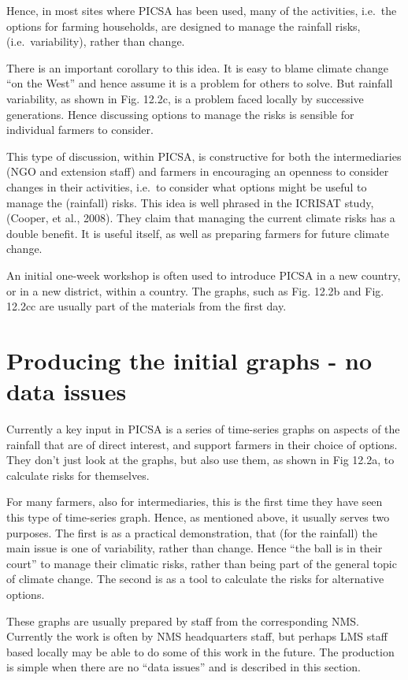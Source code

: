 \documentclass[
  letterpaper,
  DIV=11,
  numbers=noendperiod]{scrreprt}
\begin{document}
Hence, in most sites where PICSA has been used, many of the activities,
i.e.~the options for farming households, are designed to manage the
rainfall risks, (i.e.~variability), rather than change.

There is an important corollary to this idea. It is easy to blame
climate change ``on the West'' and hence assume it is a problem for
others to solve. But rainfall variability, as shown in Fig. 12.2c, is a
problem faced locally by successive generations. Hence discussing
options to manage the risks is sensible for individual farmers to
consider.

This type of discussion, within PICSA, is constructive for both the
intermediaries (NGO and extension staff) and farmers in encouraging an
openness to consider changes in their activities, i.e.~to consider what
options might be useful to manage the (rainfall) risks. This idea is
well phrased in the ICRISAT study, (Cooper, et al., 2008). They claim
that managing the current climate risks has a double benefit. It is
useful itself, as well as preparing farmers for future climate change.

An initial one-week workshop is often used to introduce PICSA in a new
country, or in a new district, within a country. The graphs, such as
Fig. 12.2b and Fig. 12.2cc are usually part of the materials from the
first day.

\section{Producing the initial graphs - no data
issues}\label{producing-the-initial-graphs---no-data-issues}

Currently a key input in PICSA is a series of time-series graphs on
aspects of the rainfall that are of direct interest, and support farmers
in their choice of options. They don't just look at the graphs, but also
use them, as shown in Fig 12.2a, to calculate risks for themselves.

For many farmers, also for intermediaries, this is the first time they
have seen this type of time-series graph. Hence, as mentioned above, it
usually serves two purposes. The first is as a practical demonstration,
that (for the rainfall) the main issue is one of variability, rather
than change. Hence ``the ball is in their court'' to manage their
climatic risks, rather than being part of the general topic of climate
change. The second is as a tool to calculate the risks for alternative
options.

These graphs are usually prepared by staff from the corresponding NMS.
Currently the work is often by NMS headquarters staff, but perhaps LMS
staff based locally may be able to do some of this work in the future.
The production is simple when there are no ``data issues'' and is
described in this section.
\end{document}
